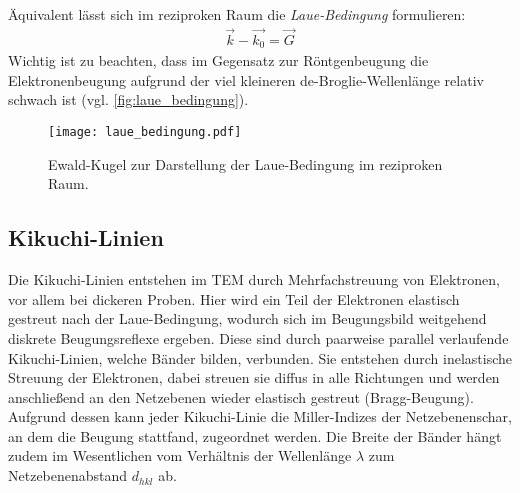 Äquivalent lässt sich im reziproken Raum die \emph{Laue-Bedingung} formulieren:
\begin{align}
\vec{k}-\vec{k_0}=\vec{G}
\end{align}
Wichtig ist zu beachten, dass im Gegensatz zur Röntgenbeugung die Elektronenbeugung aufgrund der viel kleineren de-Broglie-Wellenlänge relativ schwach ist (vgl. \autoref{fig:laue_bedingung}).
\begin{figure}[h]
	\centering
	\texttt{[image: laue\_bedingung.pdf]}
	\caption[Laue-Bedingung]{Ewald-Kugel zur Darstellung der Laue-Bedingung im reziproken Raum.}
	\label{fig:laue_bedingung}
\end{figure}

\subsection{Kikuchi-Linien}
Die Kikuchi-Linien entstehen im TEM durch Mehrfachstreuung von Elektronen, vor allem bei dickeren Proben. Hier wird ein Teil der Elektronen elastisch gestreut nach der Laue-Bedingung, wodurch sich im Beugungsbild weitgehend diskrete Beugungsreflexe ergeben. Diese sind durch paarweise parallel verlaufende Kikuchi-Linien, welche Bänder bilden, verbunden. Sie entstehen durch inelastische Streuung der Elektronen, dabei streuen sie diffus in alle Richtungen und werden anschließend an den Netzebenen wieder elastisch gestreut (Bragg-Beugung).
Aufgrund dessen kann jeder Kikuchi-Linie die Miller-Indizes der Netzebenenschar, an dem die Beugung stattfand, zugeordnet werden. Die Breite der Bänder hängt zudem im Wesentlichen vom Verhältnis der Wellenlänge $\lambda$ zum Netzebenenabstand $d_{hkl}$ ab.